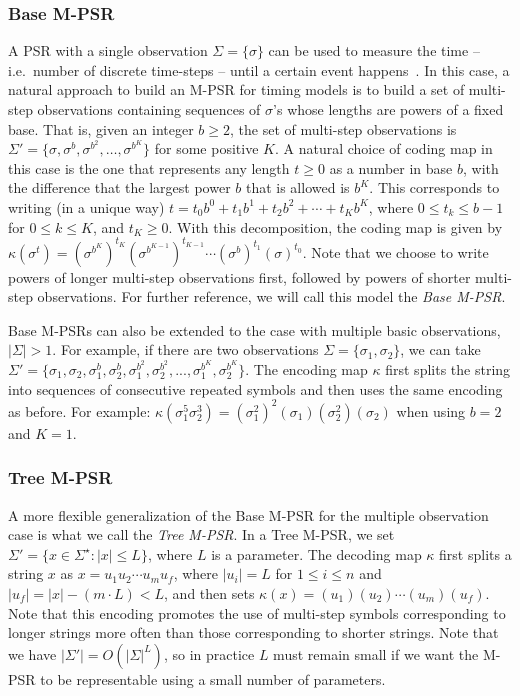 \documentclass[letterpaper]{article}
\begin{document}
\subsubsection{Base M-PSR}
A PSR with a single observation $\Sigma = \{\sigma\}$ can be used to measure the time -- i.e.\ number of discrete time-steps -- until a certain event happens~\cite{ODM}. In this case, a natural approach to build an M-PSR for timing models is to build a set of multi-step observations containing sequences of $\sigma$'s whose lengths are powers of a fixed base. That is, given an integer $b \geq 2$, the set of multi-step observations is $\Sigma' = \{\sigma,\sigma^b, \sigma^{b^2}, \ldots, \sigma^{b^K}\}$ for some positive $K$. A natural choice of coding map in this case is the one that represents any length $t \geq 0$ as a number in base $b$, with the difference that the largest power $b$ that is allowed is $b^K$. This corresponds to writing (in a unique way) $t = t_0 b^0 + t_1 b^1 + t_2 b^2 + \cdots + t_K b^K$, where $0 \leq t_k \leq b - 1$ for $0 \leq k \leq K$, and $t_K \geq 0$. With this decomposition, the coding map is given by $\kappa(\sigma^t) = (\sigma^{b^K})^{t_K} (\sigma^{b^{K-1}})^{t_{K-1}} \cdots (\sigma^b)^{t_1} (\sigma)^{t_0}$. Note that we choose to write powers of longer multi-step observations first, followed by powers of shorter multi-step observations. For further reference, we will call this model the \emph{Base M-PSR}.

Base M-PSRs can also be extended to the case with multiple basic observations, $|\Sigma| > 1$. For example, if there are two observations $\Sigma = \{\sigma_1, \sigma_2\}$, we can take $\Sigma' = \{\sigma_1,\sigma_2,\sigma_1^b,\sigma_2^{b},\sigma_1^{b^2},\sigma_2^{b^2}, ...,\sigma_1^{b^K},\sigma_2^{b^K}\}$. The encoding map $\kappa$ first splits the string into sequences of consecutive repeated symbols and then uses the same encoding as before. For example: $\kappa(\sigma_1^5 \sigma_2^3)=(\sigma_1^2)^2(\sigma_1)(\sigma_2^2)(\sigma_2)$ when using $b = 2$ and $K = 1$.

\subsubsection{Tree M-PSR}
 
A more flexible generalization of the Base M-PSR for the multiple observation case is what we call the \emph{Tree M-PSR}. In a Tree M-PSR, we set $\Sigma'= \{x \in \Sigma^\star : |x| \leq L\}$, where $L$ is a parameter. The decoding map $\kappa$ first splits a string $x$ as $x=u_1 u_2 \cdots u_m u_f$, where $|u_i| = L$ for $1 \leq i \leq n$ and $|u_f| =|x|-(m \cdot L) < L$, and then sets $\kappa(x) = (u_1)(u_2) \cdots (u_m) (u_f)$. Note that this encoding promotes the use of multi-step symbols corresponding to longer strings more often than those corresponding to shorter strings. Note that we have $|\Sigma'|= O({|\Sigma|}^L)$, so in practice $L$ must remain small if we want the M-PSR to be representable using a small number of parameters. 
\end{document}
